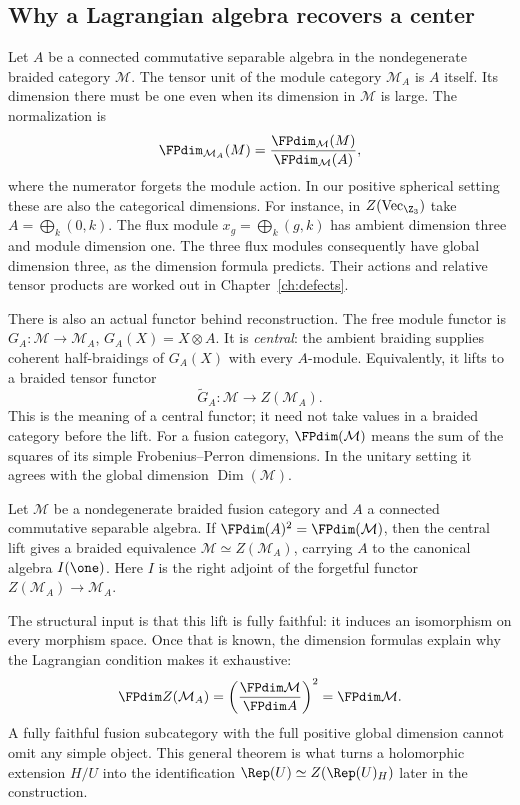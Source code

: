 \subsection{Why a Lagrangian algebra recovers a center}
\label{sec:lagrangian-reconstruction}
Let $A$ be a connected commutative separable algebra in the
nondegenerate braided category $\mathcal M$.
The tensor unit of the module category $\mathcal M_A$ is $A$ itself.
Its dimension there must be one even when its dimension in
$\mathcal M$ is large. The normalization is
\[
 \FPdim_{\mathcal M_A}(M)
   =\frac{\FPdim_{\mathcal M}(M)}{\FPdim_{\mathcal M}(A)},
\]
where the numerator forgets the module action. In our positive
spherical setting these are also the categorical dimensions.
For instance, in $Z(\operatorname{Vec}_{\Z_3})$ take
$A=\bigoplus_k(0,k)$. The flux module
$x_g=\bigoplus_k(g,k)$ has ambient dimension three and module
dimension one. The three flux modules consequently have global
dimension three, as the dimension formula predicts. Their actions
and relative tensor products are worked out in
Chapter~\ref{ch:defects}.

There is also an actual functor behind reconstruction. The free
module functor is
$G_A:\mathcal M\to\mathcal M_A$, $G_A(X)=X\otimes A$.
It is \emph{central}: the ambient braiding supplies coherent
half-braidings of $G_A(X)$ with every $A$-module. Equivalently,
it lifts to a braided tensor functor
\[
 \widetilde G_A:\mathcal M\longrightarrow Z(\mathcal M_A).
\]
This is the meaning of a central functor; it need not take values in
a braided category before the lift.
For a fusion category, $\FPdim(\mathcal M)$ means the sum of the
squares of its simple Frobenius--Perron dimensions. In the unitary
setting it agrees with the global dimension $\operatorname{Dim}(\mathcal M)$.

\begin{theorem}
\label{thm:lagrangian-reconstruction}
Let $\mathcal M$ be a nondegenerate braided fusion category and
$A$ a connected commutative separable algebra. If
$\FPdim(A)^2=\FPdim(\mathcal M)$, then the central lift gives
a braided equivalence
$\mathcal M\simeq Z(\mathcal M_A)$, carrying $A$ to the canonical
algebra $I(\one)$. Here $I$ is the right adjoint of the forgetful
functor $Z(\mathcal M_A)\to\mathcal M_A$.
\end{theorem}
The structural input is that this lift is fully faithful: it induces
an isomorphism on every morphism space. Once that is known, the
dimension formulas explain why the Lagrangian condition
makes it exhaustive:
\[
 \FPdim Z(\mathcal M_A)
 =\left(\frac{\FPdim\mathcal M}{\FPdim A}\right)^2
 =\FPdim\mathcal M.
\]
A fully faithful fusion subcategory with the full positive global
dimension cannot omit any simple object. This general theorem is
what turns a holomorphic extension $H/U$ into the identification
$\Rep(U)\simeq Z(\Rep(U)_H)$ later in the construction.

